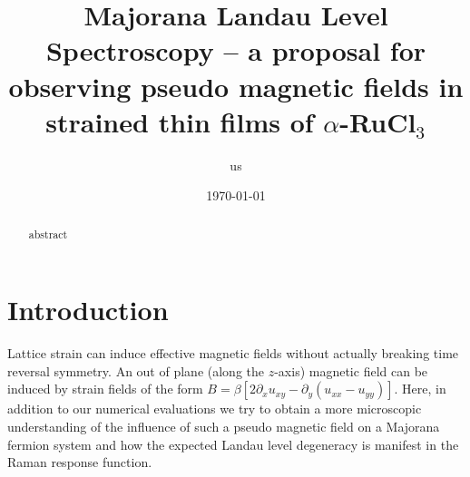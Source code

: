 \documentclass[reprint,amsmath,amssymb,aps,prb,groupedaddress,nofootinbib,superscriptaddress]{revtex4-1}
\newcommand{\1}{\mathds{1}}
\newcommand{\fb}{\it \color{orange}}
\newcommand{\bp}{ \color{straw} }
\newcommand{\np}{ \color{darkblue}}
\newcommand{\jk}{\it \color{darkgreen}}
\begin{document}
	
	
	
	\title{Majorana Landau Level Spectroscopy  --  a proposal for observing pseudo magnetic fields in  strained thin films of $\alpha$-RuCl$_3$}
		\author{us}
		
		\date{\today} 
		
		
		\begin{abstract}
		 	abstract
		\end{abstract}
		
		
		
		\maketitle
		
		
		
	
	
	\section{Introduction}
	
Lattice strain can induce effective magnetic fields without actually breaking time reversal symmetry. An out of plane (along the $z$-axis) magnetic field can be induced by strain fields of the form $B=\beta \left[2 \partial_x u_{xy}-\partial_y (u_{xx}-u_{yy}) \right]$. Here, in addition to our numerical evaluations we try to obtain a more microscopic understanding of the influence of such a pseudo magnetic field on a Majorana fermion system and how the expected Landau level degeneracy is manifest in the Raman response function. 
\end{document}
